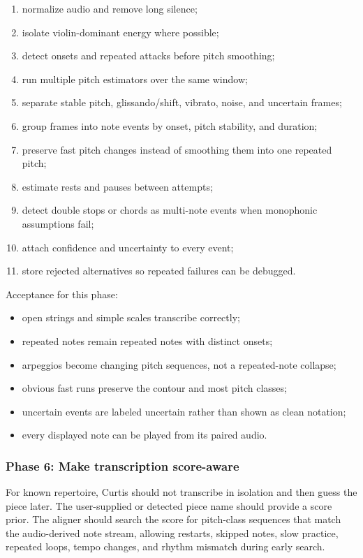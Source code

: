\begin{enumerate}
    \item normalize audio and remove long silence;
    \item isolate violin-dominant energy where possible;
    \item detect onsets and repeated attacks before pitch smoothing;
    \item run multiple pitch estimators over the same window;
    \item separate stable pitch, glissando/shift, vibrato, noise, and uncertain frames;
    \item group frames into note events by onset, pitch stability, and duration;
    \item preserve fast pitch changes instead of smoothing them into one repeated pitch;
    \item estimate rests and pauses between attempts;
    \item detect double stops or chords as multi-note events when monophonic assumptions fail;
    \item attach confidence and uncertainty to every event;
    \item store rejected alternatives so repeated failures can be debugged.
\end{enumerate}

Acceptance for this phase:
\begin{itemize}
    \item open strings and simple scales transcribe correctly;
    \item repeated notes remain repeated notes with distinct onsets;
    \item arpeggios become changing pitch sequences, not a repeated-note collapse;
    \item obvious fast runs preserve the contour and most pitch classes;
    \item uncertain events are labeled uncertain rather than shown as clean notation;
    \item every displayed note can be played from its paired audio.
\end{itemize}

\subsubsection*{Phase 6: Make transcription score-aware}

For known repertoire, Curtis should not transcribe in isolation and then guess the piece later. The user-supplied or detected piece name should provide a score prior. The aligner should search the score for pitch-class sequences that match the audio-derived note stream, allowing restarts, skipped notes, slow practice, repeated loops, tempo changes, and rhythm mismatch during early search.

